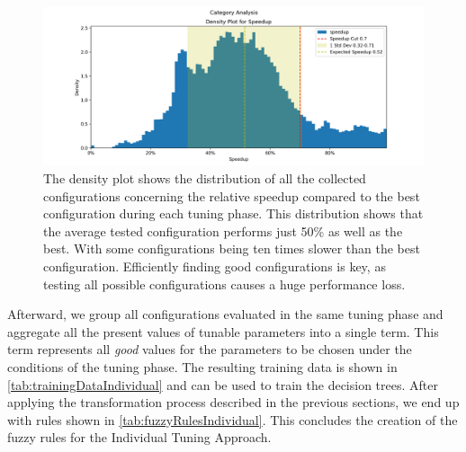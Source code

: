 \begin{figure}[H]
    \centering
    \includegraphics[width=\columnwidth,trim={1cm 0 2cm 1.5cm},clip]{figures/DataAnalytics/speedup.png}
    \caption[Speedup density plot of all configurations]{The density plot shows the distribution of all the collected configurations concerning the relative speedup compared to the best configuration during each tuning phase. This distribution shows that the average tested configuration performs just 50\% as well as the best. With some configurations being ten times slower than the best configuration.
        Efficiently finding good configurations is key, as testing all possible configurations causes a huge performance loss.}
    \label{fig:speedup}
\end{figure}

Afterward, we group all configurations evaluated in the same tuning phase and aggregate all the present values of tunable parameters into a single term. This term represents all \emph{good} values for the parameters to be chosen under the conditions of the tuning phase. The resulting training data is shown in \autoref{tab:trainingDataIndividual} and can be used to train the decision trees. After applying the transformation process described in the previous sections, we end up with rules shown in \autoref{tab:fuzzyRulesIndividual}. This concludes the creation of the fuzzy rules for the Individual Tuning Approach.




